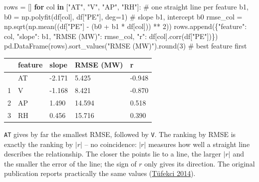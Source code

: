\documentclass[
  letterpaper,
  DIV=11,
  numbers=noendperiod]{scrreprt}
\newenvironment{Shaded}{\begin{snugshade}}{\end{snugshade}}
\newcommand{\BuiltInTok}[1]{\textcolor[rgb]{0.00,0.23,0.31}{#1}}
\newcommand{\CommentTok}[1]{\textcolor[rgb]{0.37,0.37,0.37}{#1}}
\newcommand{\ControlFlowTok}[1]{\textcolor[rgb]{0.00,0.23,0.31}{\textbf{#1}}}
\newcommand{\DecValTok}[1]{\textcolor[rgb]{0.68,0.00,0.00}{#1}}
\newcommand{\KeywordTok}[1]{\textcolor[rgb]{0.00,0.23,0.31}{\textbf{#1}}}
\newcommand{\NormalTok}[1]{\textcolor[rgb]{0.00,0.23,0.31}{#1}}
\newcommand{\OperatorTok}[1]{\textcolor[rgb]{0.37,0.37,0.37}{#1}}
\newcommand{\StringTok}[1]{\textcolor[rgb]{0.13,0.47,0.30}{#1}}
\begin{document}
\begin{tcolorbox}[enhanced jigsaw, left=2mm, title=\textcolor{quarto-callout-caution-color}{\faFire}\hspace{0.5em}{Solution to Exercise 2}, opacityback=0, breakable, rightrule=.15mm, arc=.35mm, toptitle=1mm, colbacktitle=quarto-callout-caution-color!10!white, opacitybacktitle=0.6, coltitle=black, colframe=quarto-callout-caution-color-frame, bottomrule=.15mm, leftrule=.75mm, bottomtitle=1mm, titlerule=0mm, toprule=.15mm, colback=white]

\begin{Shaded}
\begin{Highlighting}[]
\NormalTok{rows }\OperatorTok{=}\NormalTok{ []}
\ControlFlowTok{for}\NormalTok{ col }\KeywordTok{in}\NormalTok{ [}\StringTok{"AT"}\NormalTok{, }\StringTok{"V"}\NormalTok{, }\StringTok{"AP"}\NormalTok{, }\StringTok{"RH"}\NormalTok{]:                       }\CommentTok{\# one straight line per feature}
\NormalTok{    b1, b0 }\OperatorTok{=}\NormalTok{ np.polyfit(df[col], df[}\StringTok{"PE"}\NormalTok{], deg}\OperatorTok{=}\DecValTok{1}\NormalTok{)         }\CommentTok{\# slope b1, intercept b0}
\NormalTok{    rmse\_col }\OperatorTok{=}\NormalTok{ np.sqrt(np.mean((df[}\StringTok{"PE"}\NormalTok{] }\OperatorTok{{-}}\NormalTok{ (b0 }\OperatorTok{+}\NormalTok{ b1 }\OperatorTok{*}\NormalTok{ df[col])) }\OperatorTok{**} \DecValTok{2}\NormalTok{))}
\NormalTok{    rows.append(\{}\StringTok{"feature"}\NormalTok{: col, }\StringTok{"slope"}\NormalTok{: b1, }\StringTok{"RMSE (MW)"}\NormalTok{: rmse\_col, }\StringTok{"r"}\NormalTok{: df[col].corr(df[}\StringTok{"PE"}\NormalTok{])\})}
\NormalTok{pd.DataFrame(rows).sort\_values(}\StringTok{"RMSE (MW)"}\NormalTok{).}\BuiltInTok{round}\NormalTok{(}\DecValTok{3}\NormalTok{)      }\CommentTok{\# best feature first}
\end{Highlighting}
\end{Shaded}

\begin{longtable}[]{@{}lllll@{}}
\toprule\noalign{}
& feature & slope & RMSE (MW) & r \\
\midrule\noalign{}
\endhead
\bottomrule\noalign{}
\endlastfoot
0 & AT & -2.171 & 5.425 & -0.948 \\
1 & V & -1.168 & 8.421 & -0.870 \\
2 & AP & 1.490 & 14.594 & 0.518 \\
3 & RH & 0.456 & 15.716 & 0.390 \\
\end{longtable}

\texttt{AT} gives by far the smallest RMSE, followed by \texttt{V}. The
ranking by RMSE is exactly the ranking by \(|r|\) -- no coincidence:
\(|r|\) measures how well a straight line describes the relationship.
The closer the points lie to a line, the larger \(|r|\) and the smaller
the error of the line; the sign of \(r\) only gives its direction. The
original publication reports practically the same values
(\href{https://doi.org/10.1016/j.ijepes.2014.02.027}{Tüfekci 2014}).

\end{tcolorbox}
\end{document}

